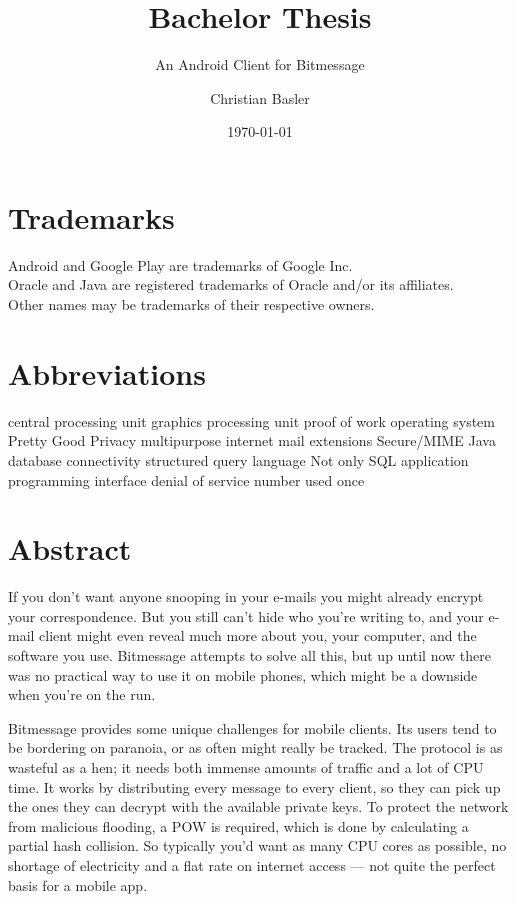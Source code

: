 \documentclass{bfh}
\title{Bachelor Thesis}
\subtitle{An Android Client for Bitmessage}
\author{Christian Basler}
\date{\today}
\begin{document}
  \lstset{language=Java}
  \maketitle

  \section*{Trademarks}
  Android and Google Play are trademarks of Google Inc.\\
  Oracle and Java are registered trademarks of Oracle and/or its affiliates.\\
  Other names may be trademarks of their respective owners.

  \section*{Abbreviations}
  \begin{acronym}[S/MIME ]
        {central processing unit}
        {graphics processing unit}
        {proof of work}
         {operating system}
        {Pretty Good Privacy}
       {multipurpose internet mail extensions}
     {Secure/\acs{MIME}}
       {Java database connectivity}
        {structured query language}
      {Not only \acs{SQL}}
        {application programming interface}
        {denial of service}
      {number used once}
  \end{acronym}


  \newpage
  \section*{Abstract}
  If you don't want anyone snooping in your e-mails you might already encrypt your correspondence. But you still can't hide who you're writing to, and your e-mail client might even reveal much more about you, your computer, and the software you use. Bitmessage attempts to solve all this, but up until now there was no practical way to use it on mobile phones, which might be a downside when you're on the run.

  Bitmessage provides some unique challenges for mobile clients. Its users tend to be bordering on paranoia, or as often might really be tracked. The protocol is as wasteful as a hen; it needs both immense amounts of traffic and a lot of \acs{CPU} time. It works by distributing every message to every client, so they can pick up the ones they can decrypt with the available private keys. To protect the network from malicious flooding, a \acl{POW} is required, which is done by calculating a partial hash collision. So typically you'd want as many \acs{CPU} cores as possible, no shortage of electricity and a flat rate on internet access --- not quite the perfect basis for a mobile app.
\end{document}
